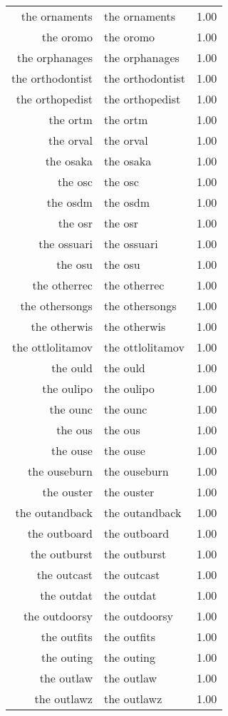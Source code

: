 \begin{table}[ht]
\begin{tabular}{rlr}
  the ornaments & the ornaments & 1.00 \\ 
  the oromo & the oromo & 1.00 \\ 
  the orphanages & the orphanages & 1.00 \\ 
  the orthodontist & the orthodontist & 1.00 \\ 
  the orthopedist & the orthopedist & 1.00 \\ 
  the ortm & the ortm & 1.00 \\ 
  the orval & the orval & 1.00 \\ 
  the osaka & the osaka & 1.00 \\ 
  the osc & the osc & 1.00 \\ 
  the osdm & the osdm & 1.00 \\ 
  the osr & the osr & 1.00 \\ 
  the ossuari & the ossuari & 1.00 \\ 
  the osu & the osu & 1.00 \\ 
  the otherrec & the otherrec & 1.00 \\ 
  the othersongs & the othersongs & 1.00 \\ 
  the otherwis & the otherwis & 1.00 \\ 
  the ottlolitamov & the ottlolitamov & 1.00 \\ 
  the ould & the ould & 1.00 \\ 
  the oulipo & the oulipo & 1.00 \\ 
  the ounc & the ounc & 1.00 \\ 
  the ous & the ous & 1.00 \\ 
  the ouse & the ouse & 1.00 \\ 
  the ouseburn & the ouseburn & 1.00 \\ 
  the ouster & the ouster & 1.00 \\ 
  the outandback & the outandback & 1.00 \\ 
  the outboard & the outboard & 1.00 \\ 
  the outburst & the outburst & 1.00 \\ 
  the outcast & the outcast & 1.00 \\ 
  the outdat & the outdat & 1.00 \\ 
  the outdoorsy & the outdoorsy & 1.00 \\ 
  the outfits & the outfits & 1.00 \\ 
  the outing & the outing & 1.00 \\ 
  the outlaw & the outlaw & 1.00 \\ 
  the outlawz & the outlawz & 1.00 \\ 

\end{tabular}
\end{table}
